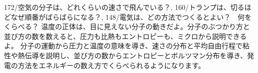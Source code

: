 \makeatletter{}\makeatother
{}%
  {172/{空気の分子は、どれくらいの速さで飛んでいる？},
   160/{トランプは、切るほどなぜ順番がばらばらになる？},
   148/{電気は、どの方法でつくるとよい？　何をくらべる？}}%
  {温度の正体は、目に見えない分子の動きだよ。分子のぶつかり方と並び方の数を数えると、圧力も比熱もエントロピーも、ミクロから説明できるよ。}%
  {分子の運動から圧力と温度の意味を導き、速さの分布と平均自由行程で粘性や熱伝導を説明し、並び方の数からエントロピーとボルツマン分布を導き、発電の方法をエネルギーの数え方でくらべられるようになります。}


